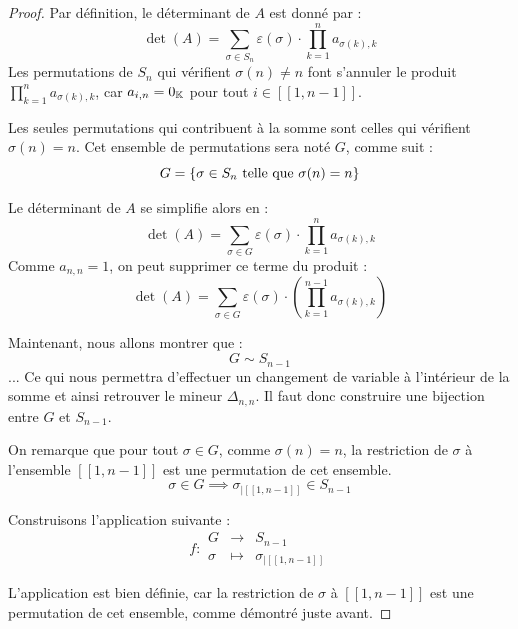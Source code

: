 \documentclass[12pt, a4paper]{report}
\begin{document}
\begin{proof}
    Par définition, le déterminant de $A$ est donné par :
    $$\det(A) = \sum_{\sigma \in S_n} \varepsilon(\sigma) \cdot \prod_{k=1}^{n} a_{\sigma(k), k}$$
    Les permutations de $S_n$ qui vérifient $\sigma(n) \ne n$ font s'annuler le produit $\prod_{k=1}^{n} a_{\sigma(k), k}$, car $a_{i,n} = 0_{\mathbb{K}}$ pour tout $i \in [\![1,n-1]\!]$.

    Les seules permutations qui contribuent à la somme sont celles qui vérifient $\sigma(n) = n$. Cet ensemble de permutations sera noté $G$, comme suit :
    $$G = \{\sigma \in S_n \text{ telle que } \sigma(n) = n\}$$
    
    Le déterminant de $A$ se simplifie alors en :
    $$\det(A) = \sum_{\sigma \in G} \varepsilon(\sigma) \cdot \prod_{k=1}^{n} a_{\sigma(k), k}$$
    Comme $a_{n,n} = 1$, on peut supprimer ce terme du produit :
    $$\det(A) = \sum_{\sigma \in G} \varepsilon(\sigma) \cdot \left(\prod_{k=1}^{n-1} a_{\sigma(k), k}\right)$$

    Maintenant, nous allons montrer que :
    $$G \sim S_{n-1}$$
    ... Ce qui nous permettra d'effectuer un changement de variable à l'intérieur de la somme et ainsi retrouver le mineur $\Delta_{n,n}$. Il faut donc construire une bijection entre $G$ et $S_{n-1}$.

    On remarque que pour tout $\sigma \in G$, comme $\sigma(n) = n$, la restriction de $\sigma$ à l'ensemble $[\![1,n-1]\!]$ est une permutation de cet ensemble.
    $$\sigma \in G \implies \sigma_{|[\![1,n-1]\!]} \in S_{n-1}$$

    Construisons l'application suivante :
    $$f : \begin{matrix} G & \to & S_{n-1} \\ \sigma & \mapsto & \sigma_{|[\![1,n-1]\!]} \end{matrix}$$

    L'application est bien définie, car la restriction de $\sigma$ à $[\![1,n-1]\!]$ est une permutation de cet ensemble, comme démontré juste avant.


\end{proof}
\end{document}

